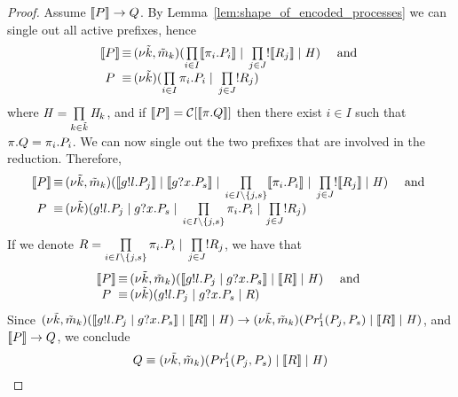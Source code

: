 \begin{proof}
Assume $\llbracket P \rrbracket\rightarrow Q$. 
By Lemma~\ref{lem:shape_of_encoded_processes} we can single out all active prefixes, hence
\[
\begin{array}{c@{\,}c@{\,}l}
\enc{\PP}
& \equiv & \rest{\tilde{\NK},\tilde{\NM}_\NK}(\prod\limits_{i\in I} \enc{\pi_i.\PP_i} \parop \prod\limits_{j\in J} \rep\enc{\PR_j} \parop \handler) \quad  \text{ and }\\
\PP 
& \equiv & \rest{\tilde{\NK}}(\prod\limits_{i\in I} \pi_i.\PP_i \parop \prod\limits_{j\in J}\rep\PR_j )
\end{array}
\]
where $\mathit{H}=\prod\limits_{k\in\tilde{k}}\mathit{H}_k$, 
and if $\llbracket P \rrbracket=\mathcal{C}[\llbracket \pi.Q \rrbracket]$ then there exist $i\in I$ such that $\pi.Q=\pi_i.P_i$. 
We can now single out the two prefixes that are involved in the reduction. Therefore,
\[
\begin{array}{c@{\,}c@{\,}l}
\enc{\PP}
& \equiv & \rest{\tilde{\NK},\tilde{\NM}_\NK}(\enc{\send\NGG\role\msg\NL.\PP_j} \parop \enc{\receive\NGG\role\msg\NX.\PP_s} \parop \prod\limits_{i\in I\setminus\{j,s\}} \enc{\pi_i.\PP_i} \parop \prod\limits_{j\in J} \rep\enc{\PR_j} \parop \handler) \quad \text{ and }\\
\PP
& \equiv & \rest{\tilde{\NK}}({\send\NGG\role\msg\NL.\PP_j} \parop {\receive\NGG\role\msg\NX.\PP_s} \parop \prod\limits_{i\in I\setminus\{j,s\}} {\pi_i.\PP_i} \parop \prod\limits_{j\in J} \rep{\PR_j} )
\end{array}
\]
If we denote $R=\prod\limits_{i\in I\setminus\{j,s\}} {\pi_i.P_i} \;|\; \prod\limits_{j\in J} ! R_j$, we have that
\[
\begin{array}{c@{\,}c@{\,}l}
\enc{\PP}
& \equiv & \rest{\tilde{\NK},\tilde{\NM}_\NK}(\enc{\send\NGG\role\msg\NL.\PP_j \parop \receive\NGG\role\msg\NX.\PP_s} \parop \enc{\PR} \parop \handler) \quad \text{ and }\\
\PP
& \equiv & \rest{\tilde{\NK}}({\send\NGG\role\msg\NL.\PP_j} \parop {\receive\NGG\role\msg\NX.\PP_s} \parop \PR )
\end{array}
\]
Since $(\nu \tilde{k},\tilde{m}_k)(\llbracket g!l.P_j \;|\; g?x.P_s \rrbracket \;|\; \llbracket R \rrbracket  \;|\; \mathit{H}) \rightarrow (\nu \tilde{k},\tilde{m}_k)(Pr_1^l(P_j, P_s) \;|\; \llbracket R \rrbracket  \;|\; \mathit{H})$, and $\llbracket P \rrbracket\rightarrow Q$, we conclude 
\[
Q\equiv (\nu \tilde{k},\tilde{m}_k)(Pr_1^l(P_j, P_s) \;|\; \llbracket R \rrbracket  \;|\; \mathit{H})
\]
\end{proof}

